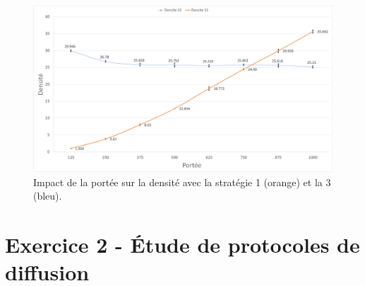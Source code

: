 \documentclass[a4paper]{article}
\begin{document}
\begin{figure}[H]
  \centering
  \includegraphics[width=\textwidth]{images/q10-11-s1and2.png}
  \caption{Impact de la portée sur la densité avec la stratégie 1 (orange) et la 3 (bleu).}
  \label{fig:S1-S3-portee}
\end{figure}


\section{Exercice 2 - Étude de protocoles de diffusion}
\end{document}
